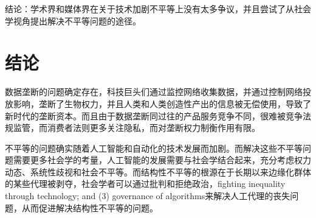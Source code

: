 \documentclass[11pt]{article}
\begin{document}
结论：学术界和媒体界在关于技术加剧不平等上没有太多争议，并且尝试了从社会学视角提出解决不平等问题的途径。

\section{结论}

数据垄断的问题确定存在，科技巨头们通过监控网络收集数据，并通过控制网络投放影响，垄断了生物权力，并且人类和人类创造性产出的信息被无偿使用，导致了新时代的垄断资本。而且由于数据垄断同过往的产品服务竞争不同，很难被竞争法规监管，而消费者法则更多关注隐私，而对垄断权力制衡作用有限。

不平等的问题确实随着人工智能和自动化的技术发展而加剧。而解决这些不平等问题需要更多社会学的考量，人工智能的发展需要与社会学结合起来，充分考虑权力动态、系统性歧视和社会不平等。而结构性不平等的根源在于长期以来边缘化群体的某些代理被剥夺，社会学者可以通过批判和拒绝政治，fighting inequality through technology; and (3) governance of algorithms来解决人工代理的丧失问题，从而促进解决结构性不平等的问题。
\end{document}
